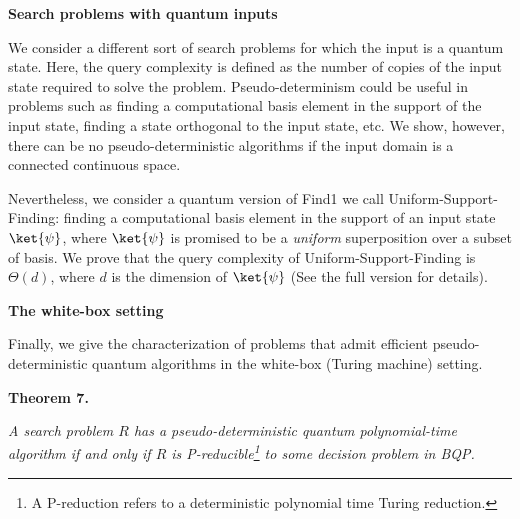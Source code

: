 \par\medskip\noindent\textbf{Search problems with quantum inputs}\par




We consider a different sort of search problems for which the input is a quantum state. Here, the query complexity is defined as the number of copies of the input state required to solve the problem.
Pseudo-determinism could be useful in problems such as finding a computational basis element in the support of the input state, finding a state orthogonal to the input state, etc. We show, however, there can be no pseudo-deterministic algorithms if the input domain is a connected continuous space.\par




Nevertheless, we consider a quantum version of Find1 we call Uniform-Support-Finding: finding a computational basis element in the support of an input state $\ket{\psi}$, where $\ket{\psi}$ is promised to be a \emph{uniform} superposition over a subset of basis. We prove that the query complexity of Uniform-Support-Finding is $\Theta(d)$, where $d$ is the dimension of $\ket{\psi}$ (See the full version for details).\par





\par\medskip\noindent\textbf{The white-box setting}\par




Finally, we give the characterization of problems that admit efficient pseudo-deterministic quantum algorithms in the white-box (Turing machine) setting.\par





\par\medskip\noindent\textbf{
\textbf{Theorem 7}\textbf{.}
}\par



\emph{A search problem ${R}$ has a pseudo-deterministic quantum polynomial-time algorithm if and only if ${R}$ is P-reducible\footnote{A P-reduction refers to a deterministic polynomial time Turing reduction.} to some decision problem in BQP.}\par



